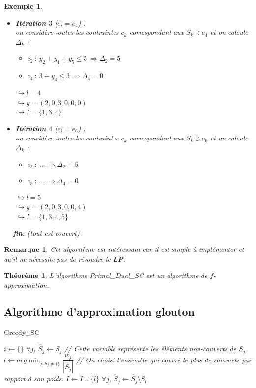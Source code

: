 \documentclass[12pt]{article}
\newcommand{\titre}[1]{\textcolor{title}{#1}}
\newtheorem{exemple}{Exemple}[section]
\newtheorem{rem}{Remarque}[section]
\newtheorem{thm}{Th\'eor\`eme}[section]
\begin{document}
\begin{exemple}
\begin{itemize}
	$\hookrightarrow y = (2,0,3,0,0,0)$\\
	$\hookrightarrow I = \{1,3\}$\\
\item \textbf{Itération $3$} ($e_i = e_4$) :\\
on considère toutes les contraintes $c_k$ correspondant aux $S_k \ni e_4$ et on
calcule $\Delta_k$ :
	\begin{itemize}
	\item $c_2\ :\ y_2+y_4+y_5 \leq 5\ \Rightarrow \Delta_2 = 5$
	\item $c_4\ :\ 3+y_4 \leq 3\ \Rightarrow \Delta_4 = 0$
	\end{itemize}
	$\hookrightarrow l = 4$\\
	$\hookrightarrow y = (2,0,3,0,0,0)$\\
	$\hookrightarrow I = \{1,3,4\}$ \\
\item \textbf{Itération $4$} ($e_i = e_6$) :\\
on considère toutes les contraintes $c_k$ correspondant aux $S_k \ni e_6$ et on
calcule $\Delta_k$ :
	\begin{itemize}
	\item $c_2\ :\ \ldots\ \Rightarrow \Delta_2 = 5$
	\item $c_5\ :\ \ldots\ \Rightarrow \Delta_4 = 0$
	\end{itemize}
	$\hookrightarrow l = 5$\\
	$\hookrightarrow y = (2,0,3,0,0,4)$\\
	$\hookrightarrow I = \{1,3,4,5\}$
\end{itemize}
\indent$\quad$ \textbf{fin.} \textit{(tout est couvert)}
\end{exemple}

\begin{rem}
Cet algorithme est intéressant car il est simple à implémenter et qu'il ne
nécessite pas de résoudre le \titre{\textbf{LP}}.
\end{rem}

\begin{thm}
L'algorithme Primal\_Dual\_SC est un algorithme de $f$-approximation.
\end{thm}

\subsection{Algorithme d'approximation glouton}

\begin{algorithm}[H]
\caption{Greedy\_SC}
\begin{algorithmic}[1]
\STATE $i\leftarrow \{\}$
\STATE $\forall j,\ \hat{S}_j \leftarrow S_j$ \textit{\scriptsize // Cette variable
représente les éléments non-couverts de $S_j$}
\STATE $l\leftarrow arg\min_{j:\hat{S}_j \neq \{\}} \dfrac{w_j}{|\hat{S}_j|}$
\textit{ \scriptsize // On choisi l'ensemble qui couvre le plus de sommets par rapport à son
poids.}
\STATE $I \leftarrow I\cup \{l\}$
\STATE $\forall j,\ \hat{S}_j \leftarrow \hat{S}_j \setminus S_l$
\ENDWHILE
\end{algorithmic}
\end{algorithm}
\end{document}
